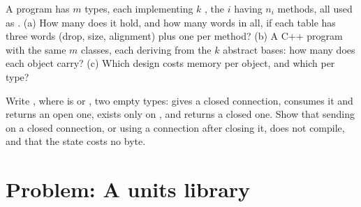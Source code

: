 \begin{exercise}[$\star\star\star$]\label{exo:b2:rust-traits-and-generics:11}
A program has $m$ types, each implementing $k$ , the  $i$ having $n_i$ methods, all used as . (a) How many  does it hold, and how many words in all, if each table has three words (drop, size,
alignment) plus one per method? (b) A C++ program with the same $m$ classes, each deriving from the $k$ abstract
bases: how many  does each object carry? (c) Which design costs memory per object, and which per type?
\end{exercise}

\begin{exercise}[$\star\star\star$]\label{exo:b2:rust-traits-and-generics:12}
Write , where  is  or , two empty types: 
gives a closed connection,  consumes it and returns an open one,  exists only on
, and  returns a closed one. Show that sending on a closed connection, or using a
connection after closing it, does not compile, and that the state costs no byte.
\end{exercise}

\section{Problem: A units library}\label{sec:b2:rust-traits-and-generics:problem}

